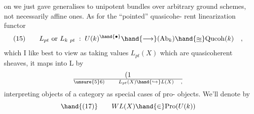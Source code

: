 on we just gave generalises to unipotent bundles over arbitrary ground
schemes, not necessarily affine ones. As for the ``pointed'' quasicohe-%
rent linearization functor
\[ (15) \qquad L_{pt} \text{ or } L_{k\ pt} \;:\; U(k)^{\hand{\bullet}} \hand{\longrightarrow} (\mathrm{Ab}_k) \hand{\underline{\approx}} \mathrm{Qucoh}(k) \quad , \]
which I like best to view as taking values $L_{pt}(X)$ which are quasicoherent
sheaves, it maps into L by
\[ (1\over{\unsure{5}}{6}) \qquad L_{pt}(X) \hand{\hookrightarrow} L(X) \quad , \]
interpreting objects of  a category as special cases of pro-%
objects. We'll denote by
\[ \hand{(17)} \qquad WL(X) \hand{\in} \mathrm{Pro}(U(k)) \]

